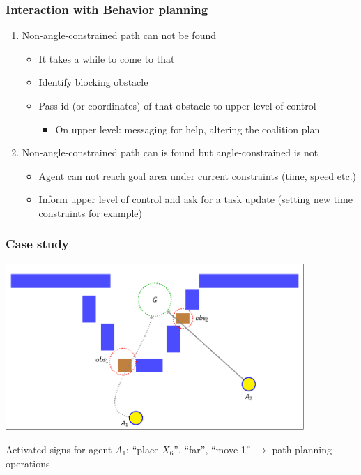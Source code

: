 \documentclass[default]{beamer}
\begin{document}
	\begin{frame}
		\frametitle{Interaction with Behavior planning}
		
		\begin{enumerate}
			\item Non-angle-constrained path can not be found
			\begin{itemize}
				\item It takes a while to come to that
				\item Identify blocking obstacle
				\item Pass id (or coordinates) of that obstacle to upper level of control
				\begin{itemize}
					\item On upper level: messaging for help, altering the coalition plan
				\end{itemize}
			\end{itemize}
			\item Non-angle-constrained path can is found but angle-constrained is not
			\begin{itemize}
				\item Agent can not reach goal area under current constraints (time, speed etc.)
				\item Inform upper level of control and ask for a task update (setting new time constraints for example)
			\end{itemize}
		\end{enumerate}
	\end{frame}

	\begin{frame}
		\frametitle{Case study}
		
		\begin{center}
			\includegraphics[page=1,width=0.85\textwidth]{slides_colored}
		\end{center}
		\par\bigskip
		Activated signs for agent $A_1$: ``place $X_6$'', ``far'', ``move 1'' $\rightarrow$ \color{red} path planning operations
	\end{frame}
	
\end{document}

